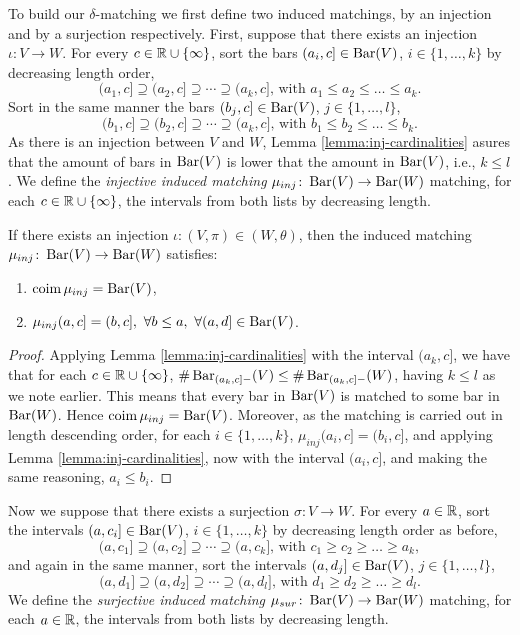 To build our $\delta$-matching we first define two induced matchings, by an injection and by a surjection respectively. First, suppose that there exists an injection $\iota \colon V \to W$. For every $ c \in \mathbb R \cup \{\infty\}$, sort the bars $(a_i, c] \in \operatorname{Bar}(V) $, $i \in \{1, \dots, k\} $ by decreasing length order,
$$
    (a_1, c] \supseteq (a_2, c] \supseteq \cdots \supseteq (a_k, c] \text{, with } a_1 \leq a_2 \leq \dots \leq a_k.
$$
Sort in the same manner the bars $(b_j, c] \in \operatorname{Bar}(V) $, $j \in \{1, \dots, l\} $,
$$
    (b_1, c] \supseteq (b_2, c] \supseteq \cdots \supseteq (a_k, c] \text{, with } b_1 \leq b_2 \leq \dots \leq b_k.
$$
As there is an injection between $ V $ and $ W$, Lemma \ref{lemma:inj-cardinalities} asures that the amount of bars in $ \operatorname{Bar}(V) $ is lower that the amount in $ \operatorname{Bar}(V) $, i.e., $ k \leq l $. We define the {\it injective induced matching} $\mu_{inj}\colon \operatorname{Bar}(V) \to \operatorname{Bar}(W) $ matching, for each $ c \in \mathbb R \cup \{\infty\} $, the intervals from both lists by decreasing length.

\begin{lemma} \label{lemma:inj-matching}
    If there exists an injection $\iota\colon (V, \pi) \in (W, \theta) $, then the induced matching $ \mu_{inj}\colon \operatorname{Bar}(V) \to \operatorname{Bar} (W) $ satisfies:
    \begin{enumerate}
        \item $\operatorname{coim} \mu_{inj} = \operatorname{Bar}(V)$, \label{prop:3.1.5. 1}
        \item $\mu_{inj}(a, c] = (b, c], \ \forall b \leq a, \ \forall (a, d] \in \operatorname{Bar}(V)$.
    \end{enumerate}
\end{lemma}
\begin{proof}
    Applying Lemma \ref{lemma:inj-cardinalities} with the interval $ (a_k, c] $, we have that for each $ c \in \mathbb R \cup \{\infty\} $, $ \# \operatorname{Bar}_{(a_k, c]-}(V) \leq \# \operatorname{Bar}_{(a_k, c]-}(W) $, having $ k \leq l $ as we note earlier. This means that every bar in $\operatorname{Bar}(V)$ is matched to some bar in $\operatorname{Bar}(W)$. Hence $\operatorname{coim} \mu_{inj} = \operatorname{Bar}(V)$. Moreover, as the matching is carried out in length descending order, for each $ i \in \{1, \dots, k\} $, $\mu_{inj}(a_i, c] = (b_i, c]$, and applying Lemma \ref{lemma:inj-cardinalities}, now with the interval $ (a_i, c] $, and making the same reasoning, $ a_i \leq b_i $.
\end{proof}

Now we suppose that there exists a surjection $ \sigma\colon V \to W $. For every $ a \in \mathbb R$, sort the intervals $(a, c_i] \in \operatorname{Bar}(V) $, $i \in \{1, \dots, k\} $ by decreasing length order as before,
$$
    (a, c_1] \supseteq (a, c_2] \supseteq \cdots \supseteq (a, c_k] \text{, with } c_1 \geq c_2 \geq \dots \geq a_k,
$$
and again in the same manner, sort the intervals $(a, d_j] \in \operatorname{Bar}(V) $, $j \in \{1, \dots, l\} $,
$$
    (a, d_1] \supseteq (a, d_2] \supseteq \cdots \supseteq (a, d_l] \text{, with } d_1 \geq d_2 \geq \dots \geq d_l.
$$
We define the {\it surjective induced matching} $\mu_{sur}\colon \operatorname{Bar}(V) \to \operatorname{Bar}(W) $ matching, for each $ a \in \mathbb R $, the intervals from both lists by decreasing length.

